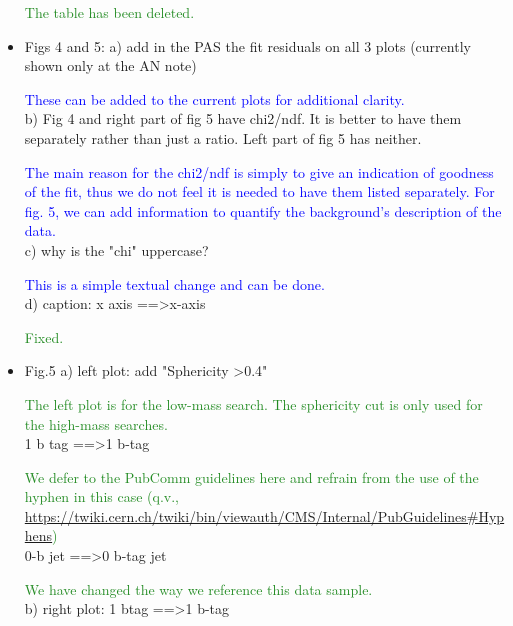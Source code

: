\documentclass[paper=a4, fontsize=11pt]{scrartcl}
\begin{document}
\begin{itemize}
\textcolor{ForestGreen}{The table has been deleted.}\\


\item Figs 4 and 5: 
a) add in the PAS the fit residuals on all 3 plots (currently shown only at 
the AN note) 

\textcolor{Blue}{These can be added to the current plots for additional clarity.}\\


b) Fig 4 and right part of fig 5 have chi2/ndf. It is better to have them 
separately rather than just a ratio. Left part of fig 5 has neither. 

\textcolor{Blue}{The main reason for the chi2/ndf is simply to give an
indication of goodness of the fit, thus we do not feel it is needed to
have them listed separately. For fig. 5, we can add information to quantify
the background's description of the data.}\\


c) why is the "chi" uppercase? 

\textcolor{Blue}{This is a simple textual change and can be done.}\\


d) caption: x axis ==\textgreater x-axis 

\textcolor{ForestGreen}{Fixed.}\\

\item Fig.5 
a) left plot: 
add "Sphericity \textgreater 0.4" 

\textcolor{ForestGreen}{The left plot is for the low-mass search. The sphericity cut is only used for the
high-mass searches.}\\

1 b tag ==\textgreater 1 b-tag 

\textcolor{ForestGreen}{We defer to the PubComm guidelines here and refrain from the use of the hyphen
in this case (q.v., \url{https://twiki.cern.ch/twiki/bin/viewauth/CMS/Internal/PubGuidelines\#Hyphens})}\\


0-b jet ==\textgreater 0 b-tag jet 

\textcolor{ForestGreen}{We have changed the way we reference this data sample.}\\

b) right plot: 
1 btag ==\textgreater 1 b-tag 


\end{itemize}
\end{document}
